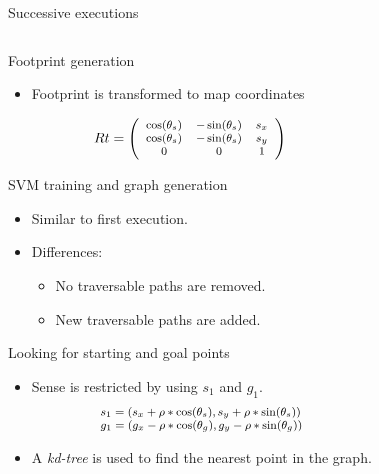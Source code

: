 \begin{frame}{Successive executions}
\begin{columns}
\begin{overlayarea}{\textwidth}{\textheight}
{\begin{block}{Footprint generation}
\begin{figure}
	  \end{figure}
	  \vskip-0.65cm
	  \begin{itemize}
	    \item Footprint is transformed to map coordinates
	  \end{itemize}
	  \begin{equation}
	    \footnotesize \nonumber
	    Rt = \left ( \begin{array}{ ccc }
	      \cos(\theta_s) & -\sin(\theta_s) & s_x \\
	      \cos(\theta_s) & -\sin(\theta_s) & s_y \\
	      0 & 0 & 1
	    \end{array} \right )
	  \end{equation}
	\end{block}
      }
       {
	\begin{block}{SVM training and graph generation}
	  \begin{itemize}
	    \item Similar to first execution.
	    \item Differences:
	    \begin{itemize}
	     \item No traversable paths are removed.
	     \item New traversable paths are added.
	    \end{itemize}
	  \end{itemize}
	\end{block}
      }
       {
	 {
	  \begin{block}{Looking for starting and goal points}
	    \only<4> {
	      \begin{itemize}
		\item Sense is restricted by using $s_1$ and $g_1$.
		  \begin{equation}\nonumber
		  \footnotesize
		  \begin {array}{l}
		  s_1 = (s_x + \rho * \cos(\theta_s), s_y + \rho * \sin(\theta_s)) \\
		  g_1 = (g_x - \rho * \cos(\theta_g), g_y - \rho * \sin(\theta_g))
		  \end{array}
		  \end{equation}
		\item A \emph{kd-tree} is used to find the nearest point in the graph.
	      \end{itemize}
	    }
	    \begin{figure}

\end{figure}
\end{block}}}
\end{overlayarea}
\end{columns}
\end{frame}
